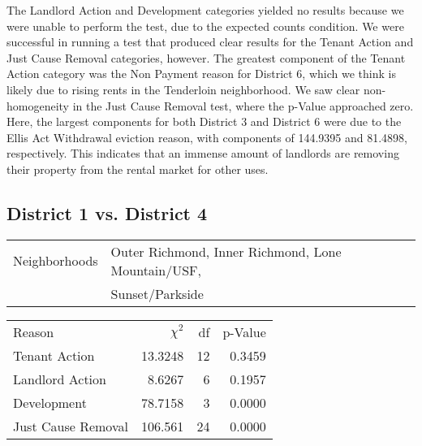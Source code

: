 \documentclass[]{article}
\begin{document}
The Landlord Action and Development categories yielded no results because we were unable to perform the test, due to the expected counts condition. We were successful in running a test that produced clear results for the Tenant Action and Just Cause Removal categories, however. The greatest component of the Tenant Action category was the Non Payment reason for District 6, which we think is likely due to rising rents in the Tenderloin neighborhood.
\newline\newline
We saw clear non-homogeneity in the Just Cause Removal test, where the p-Value approached zero. Here, the largest components for both District 3 and District 6 were due to the Ellis Act Withdrawal eviction reason, with components of 144.9395 and 81.4898, respectively. This indicates that an immense amount of landlords are removing their property from the rental market for other uses.

\subsection{District 1 vs. District 4}
\begin{table}[!h]
\centering
\begin{tabular}{l | l}
Neighborhoods &  Outer Richmond, Inner Richmond, Lone Mountain/USF,  \\ 
			  &  Sunset/Parkside \\
\end{tabular}
\end{table}

\begin {table}[!h]
\centering
\begin{tabular}{l | r | r | r}	
Reason				 &  $\chi ^{2}$ & df    & p-Value   \\
Tenant Action 		 &  13.3248     & 12    & 0.3459    \\
Landlord Action	     &  8.6267      & 6     & 0.1957    \\
Development			 &  78.7158     & 3     & 0.0000    \\
Just Cause Removal	 &  106.561     & 24    & 0.0000    \\
\end{tabular} \newline
\end{table}
\end{document}
